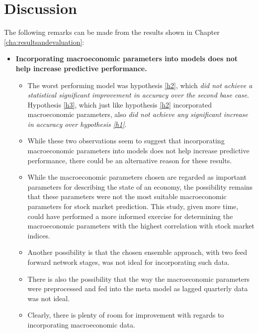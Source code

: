 \documentclass{UoYCSproject}
\begin{document}
\section{Discussion}
The following remarks can be made from the results shown in Chapter \ref{cha:resultsandevaluation}:
\begin{itemize}
    \item \textbf{Incorporating macroeconomic parameters into models does not help increase predictive performance.} 
        \begin{itemize}
            \item The worst performing model was hypothesis \ref{h2}, which \textit{did not achieve a statistical significant improvement in accuracy over the second base case}. Hypothesis \ref{h3}, which just like hypothesis \ref{h2} incorporated macroeconomic parameters, also \textit{did not achieve any significant increase in accuracy over hypothesis \ref{h1}}.
            \item While these two observations seem to suggest that incorporating macroeconomic parameters into models does not help increase predictive performance, there could be an alternative reason for these results.
            \item While the macroeconomic parameters chosen are regarded as important parameters for describing the state of an economy, the possibility remains that these parameters were not the most suitable macroeconomic parameters for stock market prediction. This study, given more time, could have performed a more informed exercise for determining the macroeconomic parameters with the highest correlation with stock market indices.
            \item  Another possibility is that the chosen ensemble approach, with two feed forward network stages, was not ideal for incorporating such data.
            \item There is also the possibility that the way the macroeconomic parameters were preprocessed and fed into the meta model as lagged quarterly data was not ideal.
            \item Clearly, there is plenty of room for improvement with regards to incorporating macroeconomic data. 
        \end{itemize}
    

\end{itemize}
\end{document}

